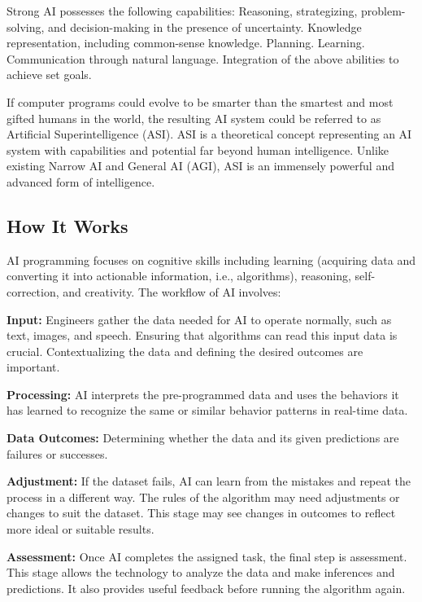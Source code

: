 \documentclass[
]{book}
\begin{document}
Strong AI possesses the following capabilities: Reasoning, strategizing, problem-solving, and decision-making in the presence of uncertainty. Knowledge representation, including common-sense knowledge. Planning. Learning. Communication through natural language. Integration of the above abilities to achieve set goals.

If computer programs could evolve to be smarter than the smartest and most gifted humans in the world, the resulting AI system could be referred to as Artificial Superintelligence (ASI). ASI is a theoretical concept representing an AI system with capabilities and potential far beyond human intelligence. Unlike existing Narrow AI and General AI (AGI), ASI is an immensely powerful and advanced form of intelligence.

\hypertarget{how-it-works}{%
\subsection{How It Works}\label{how-it-works}}

AI programming focuses on cognitive skills including learning (acquiring data and converting it into actionable information, i.e., algorithms), reasoning, self-correction, and creativity. The workflow of AI involves:

\textbf{Input:} Engineers gather the data needed for AI to operate normally, such as text, images, and speech. Ensuring that algorithms can read this input data is crucial. Contextualizing the data and defining the desired outcomes are important.

\textbf{Processing:} AI interprets the pre-programmed data and uses the
behaviors it has learned to recognize the same or similar behavior
patterns in real-time data.

\textbf{Data Outcomes:} Determining whether the data and its given
predictions are failures or successes.

\textbf{Adjustment:} If the dataset fails, AI can learn from the mistakes and repeat the process in a different way. The rules of the algorithm may need adjustments or changes to suit the dataset. This stage may see changes in outcomes to reflect more ideal or suitable results.

\textbf{Assessment:} Once AI completes the assigned task, the final step is assessment. This stage allows the technology to analyze the data and make inferences and predictions. It also provides useful feedback before running the algorithm again.
\end{document}
